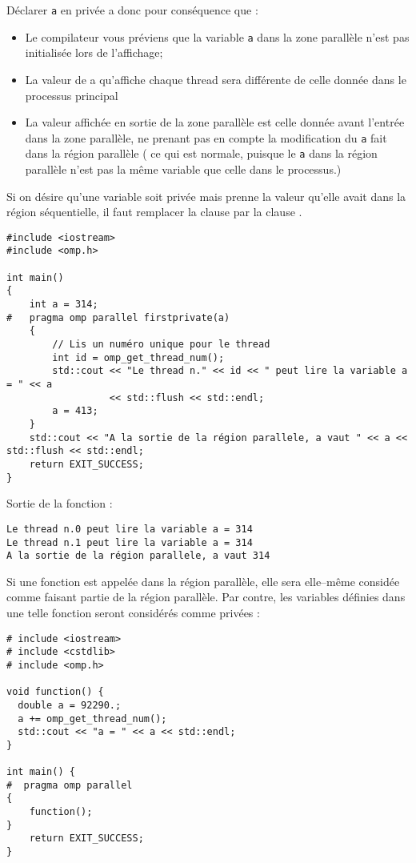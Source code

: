 \documentclass[fleqn,11pt]{article}
\begin{document}
Déclarer \texttt{a} en privée a donc pour conséquence que :
\begin{itemize}
  \item Le compilateur vous préviens que la variable \texttt{a} dans la zone parallèle n'est pas initialisée
  lors de l'affichage;
  \item La valeur de a qu'affiche chaque thread sera différente de celle donnée dans le processus principal
  \item La valeur affichée en sortie de la zone parallèle est celle donnée avant l'entrée dans la zone parallèle, ne prenant pas en compte la modification du \texttt{a} fait dans la région parallèle ( ce qui est normale, puisque le \texttt{a} dans la région parallèle n'est pas la même variable que celle dans le processus.)
\end{itemize}


Si on désire qu'une variable soit privée mais prenne la valeur qu'elle avait dans la région séquentielle, il faut remplacer la clause \lstinline@private@ par la clause \lstinline@firstprivate@.

\begin{lstlisting}
#include <iostream>
#include <omp.h>

int main()
{
    int a = 314;
#   pragma omp parallel firstprivate(a)
    {
        // Lis un numéro unique pour le thread
        int id = omp_get_thread_num();
        std::cout << "Le thread n." << id << " peut lire la variable a = " << a 
                  << std::flush << std::endl;
        a = 413;
    }
    std::cout << "A la sortie de la région parallele, a vaut " << a << std::flush << std::endl;
    return EXIT_SUCCESS;
}
\end{lstlisting}

Sortie de la fonction :
\begin{verbatim}
Le thread n.0 peut lire la variable a = 314
Le thread n.1 peut lire la variable a = 314
A la sortie de la région parallele, a vaut 314
\end{verbatim}

Si une fonction est appelée dans la région parallèle, elle sera elle--même considée comme faisant partie de la
région parallèle. Par contre, les variables définies dans une telle fonction seront considérés comme privées :

\begin{lstlisting}
# include <iostream>
# include <cstdlib>
# include <omp.h>

void function() {
  double a = 92290.;
  a += omp_get_thread_num();
  std::cout << "a = " << a << std::endl;
}

int main() {
#  pragma omp parallel
{
    function();
}
    return EXIT_SUCCESS;
}
\end{lstlisting}
\end{document}
